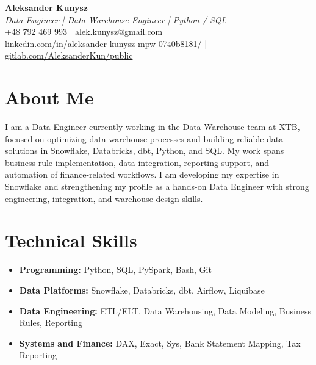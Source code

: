 \documentclass[a4paper,11pt]{article}
\begin{document}
\begin{center}
{\LARGE \textbf{Aleksander Kunysz}}\\[2pt]
\textit{Data Engineer | Data Warehouse Engineer | Python / SQL}\\[2pt]
\small
+48 792 469 993 \quad | \quad alek.kunysz@gmail.com\\
\href{https://linkedin.com/in/aleksander-kunysz-mpw-0740b8181/}{linkedin.com/in/aleksander-kunysz-mpw-0740b8181/}
\quad | \quad
\href{https://gitlab.com/AleksanderKun/public}{gitlab.com/AleksanderKun/public}
\end{center}

\vspace{2mm}
\section*{About Me}
I am a Data Engineer currently working in the Data Warehouse team at XTB, focused on optimizing data warehouse processes and building reliable data solutions in Snowflake, Databricks, dbt, Python, and SQL. My work spans business-rule implementation, data integration, reporting support, and automation of finance-related workflows. I am developing my expertise in Snowflake and strengthening my profile as a hands-on Data Engineer with strong engineering, integration, and warehouse design skills.

\section*{Technical Skills}
\begin{itemize}
  \item \textbf{Programming:} Python, SQL, PySpark, Bash, Git
  \item \textbf{Data Platforms:} Snowflake, Databricks, dbt, Airflow, Liquibase
  \item \textbf{Data Engineering:} ETL/ELT, Data Warehousing, Data Modeling, Business Rules, Reporting
  \item \textbf{Systems and Finance:} DAX, Exact, Sys, Bank Statement Mapping, Tax Reporting
\end{itemize}
\end{document}
